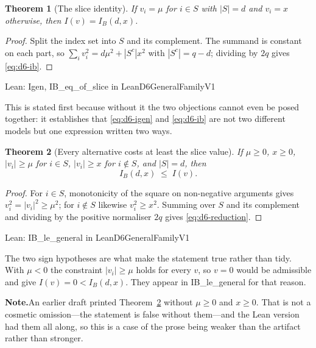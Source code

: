 \documentclass[conference]{IEEEtran}
\newtheorem{theorem}{Theorem}
\theoremstyle{definition}
\newcommand{\lean}[1]{\textsf{\footnotesize #1}}
\newcommand{\leanbox}[1]{%
  \par\vspace{2pt}\noindent
  {\footnotesize\textsf{Lean: #1}}\par\vspace{2pt}}
\newif\ifshownotes\shownotestrue
\newcommand{\NOTEPAR}[1]{\ifshownotes\par\vspace{2pt}\noindent%
  {\color{notecol}\textsf{\footnotesize\textbf{Note.}\;#1}}\par\vspace{2pt}\fi}
\begin{document}
\begin{theorem}[The slice identity]
\label{thm:d6-slice}
If $v_{i}=\mu$ for $i\in S$ with $|S|=d$ and $v_{i}=x$ otherwise, then $I(v)=I_{B}(d,x)$.
\end{theorem}

\begin{proof}
Split the index set into $S$ and its complement. The summand is constant on each part, so
$\sum_{i}v_{i}^{2}=d\mu^{2}+|S^{c}|x^{2}$ with $|S^{c}|=q-d$; dividing by $2q$ gives
\eqref{eq:d6-ib}.
\end{proof}

\leanbox{\lean{Igen}, \lean{IB\_eq\_of\_slice} in \lean{LeanD6GeneralFamilyV1}}

This is stated first because without it the two objections cannot even be posed together: it
establishes that \eqref{eq:d6-igen} and \eqref{eq:d6-ib} are not two different models but one
expression written two ways.

\begin{theorem}[Every alternative costs at least the slice value]
\label{thm:d6-reduction}
If $\mu\ge0$, $x\ge0$, $|v_{i}|\ge\mu$ for $i\in S$, $|v_{i}|\ge x$ for $i\notin S$, and
$|S|=d$, then
\begin{equation}
I_{B}(d,x)\;\leq\;I(v).
\label{eq:d6-reduction}
\end{equation}
\end{theorem}

\begin{proof}
For $i\in S$, monotonicity of the square on non-negative arguments gives
$v_{i}^{2}=|v_{i}|^{2}\ge\mu^{2}$; for $i\notin S$ likewise $v_{i}^{2}\ge x^{2}$. Summing over
$S$ and its complement and dividing by the positive normaliser $2q$ gives
\eqref{eq:d6-reduction}.
\end{proof}

\leanbox{\lean{IB\_le\_general} in \lean{LeanD6GeneralFamilyV1}}

The two sign hypotheses are what make the statement true rather than tidy. With $\mu<0$ the
constraint $|v_{i}|\ge\mu$ holds for every $v$, so $v=0$ would be admissible and give
$I(v)=0<I_{B}(d,x)$. They appear in \lean{IB\_le\_general} for that reason.
\NOTEPAR{An earlier draft printed Theorem~\ref{thm:d6-reduction} without $\mu\ge0$ and
$x\ge0$. That is not a cosmetic omission---the statement is false without them---and the Lean
version had them all along, so this is a case of the prose being weaker than the artifact
rather than stronger.}
\end{document}
